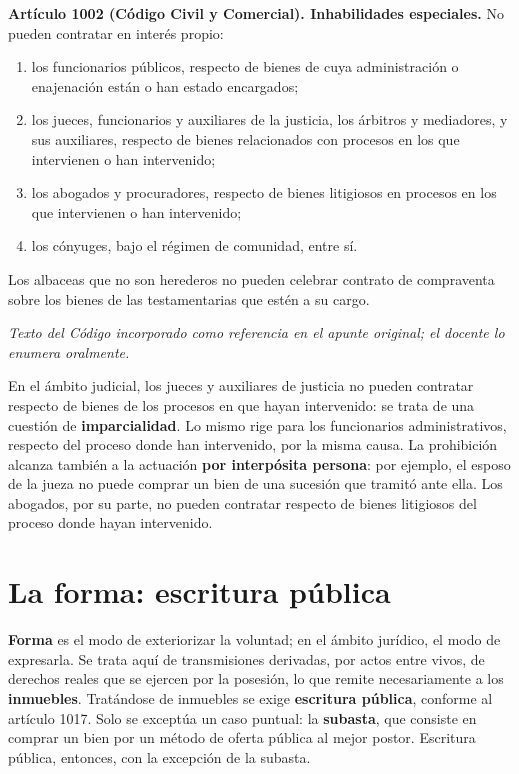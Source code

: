 \documentclass[12pt,oneside]{book}
\begin{document}
\begin{note}
\textbf{Artículo 1002 (Código Civil y Comercial). Inhabilidades especiales.} No pueden contratar en interés propio:
\begin{enumerate}[label=\alph*),topsep=0.2em]
    \item los funcionarios públicos, respecto de bienes de cuya administración o enajenación están o han estado encargados;
    \item los jueces, funcionarios y auxiliares de la justicia, los árbitros y mediadores, y sus auxiliares, respecto de bienes relacionados con procesos en los que intervienen o han intervenido;
    \item los abogados y procuradores, respecto de bienes litigiosos en procesos en los que intervienen o han intervenido;
    \item los cónyuges, bajo el régimen de comunidad, entre sí.
\end{enumerate}
Los albaceas que no son herederos no pueden celebrar contrato de compraventa sobre los bienes de las testamentarias que estén a su cargo.

\emph{Texto del Código incorporado como referencia en el apunte original; el docente lo enumera oralmente.}
\end{note}

En el ámbito judicial, los jueces y auxiliares de justicia no pueden contratar respecto de bienes de los procesos en que hayan intervenido: se trata de una cuestión de \textbf{imparcialidad}. Lo mismo rige para los funcionarios administrativos, respecto del proceso donde han intervenido, por la misma causa. La prohibición alcanza también a la actuación \textbf{por interpósita persona}: por ejemplo, el esposo de la jueza no puede comprar un bien de una sucesión que tramitó ante ella. Los abogados, por su parte, no pueden contratar respecto de bienes litigiosos del proceso donde hayan intervenido.

\section{La forma: escritura pública}

\textbf{Forma} es el modo de exteriorizar la voluntad; en el ámbito jurídico, el modo de expresarla. Se trata aquí de transmisiones derivadas, por actos entre vivos, de derechos reales que se ejercen por la posesión, lo que remite necesariamente a los \textbf{inmuebles}. Tratándose de inmuebles se exige \textbf{escritura pública}, conforme al artículo 1017. Solo se exceptúa un caso puntual: la \textbf{subasta}, que consiste en comprar un bien por un método de oferta pública al mejor postor. Escritura pública, entonces, con la excepción de la subasta.
\end{document}
